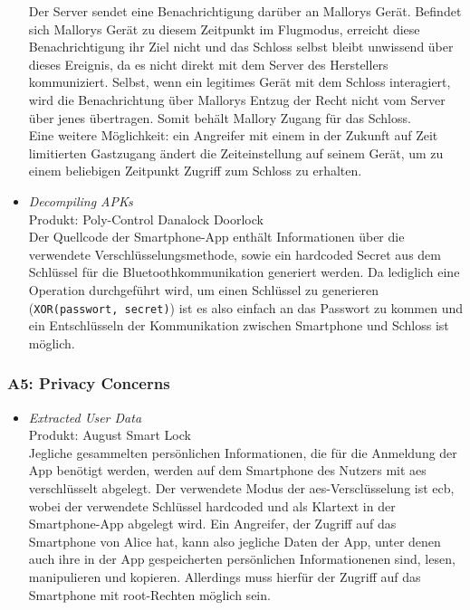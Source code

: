 \begin{itemize}[leftmargin=0cm,label={}]
                Der Server sendet eine Benachrichtigung darüber an Mallorys Gerät. 
                Befindet sich Mallorys Gerät zu diesem Zeitpunkt im Flugmodus, erreicht diese Benachrichtigung ihr Ziel nicht und das Schloss selbst bleibt unwissend über dieses Ereignis, da es nicht direkt mit dem Server des Herstellers kommuniziert. 
                Selbst, wenn ein legitimes Gerät mit dem Schloss interagiert, wird die Benachrichtung über Mallorys Entzug der Recht nicht vom Server über jenes übertragen.
                Somit behält Mallory Zugang für das Schloss.\\
                Eine weitere Möglichkeit: ein Angreifer mit einem in der Zukunft auf Zeit limitierten Gastzugang ändert die Zeiteinstellung auf seinem Gerät, um zu einem beliebigen Zeitpunkt Zugriff zum Schloss zu erhalten.
            \item \emph{Decompiling APKs}\cite{Rose2016}\label{vuln:decompile}\\
                Produkt: Poly-Control Danalock Doorlock\\
                Der Quellcode der Smartphone-App enthält Informationen über die verwendete Verschlüsselungsmethode, sowie ein hardcoded Secret aus dem Schlüssel für die Bluetoothkommunikation generiert werden.
	            Da lediglich eine Operation durchgeführt wird, um einen Schlüssel zu generieren (\sloppy\colorbox{light-gray}{\lstinline{XOR(passwort, secret)}}) ist es also einfach an das Passwort zu kommen und ein Entschlüsseln der Kommunikation zwischen Smartphone und Schloss ist möglich.
        \end{itemize}
        
    \subsubsection*{A5: Privacy Concerns}
        \begin{itemize}[leftmargin=0cm,label={}]
            \item \emph{Extracted User Data}\cite{Lariviere2015,Ye2017}\label{vuln:userdata}\\
                Produkt: August Smart Lock\\ 
                Jegliche gesammelten persönlichen Informationen, die für die Anmeldung der App benötigt werden, werden auf dem Smartphone des Nutzers mit \gls{aes} verschlüsselt abgelegt. 
                Der verwendete Modus der \gls{aes}-Versclüsselung ist \gls{ecb}, wobei der verwendete Schlüssel hardcoded und als Klartext in der Smartphone-App abgelegt wird. 
    		    Ein Angreifer, der Zugriff auf das Smartphone von Alice hat, kann also jegliche Daten der App, unter denen auch ihre in der App gespeicherten persönlichen Informationenen sind, lesen, manipulieren und kopieren. 
    		    Allerdings muss hierfür der Zugriff auf das Smartphone mit root-Rechten möglich sein.
        \end{itemize}
    
